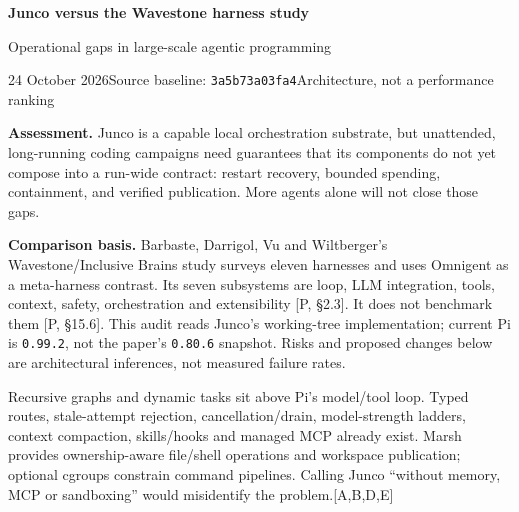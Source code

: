 \documentclass[10pt,a4paper]{article}
\newcommand{\heading}[1]{\par\vspace{5pt}{\large\bfseries\color{ink}#1}\par\vspace{2pt}}
\newcommand{\src}[1]{\textcolor{accent}{\scriptsize[#1]}}
\begin{document}
{\LARGE\bfseries\color{ink}Junco versus the Wavestone harness study}\par
{\large Operational gaps in large-scale agentic programming}\par
{\small 24 October 2026\quad\textbullet\quad Source baseline: \texttt{3a5b73a03fa4}\quad\textbullet\quad Architecture, not a performance ranking}

\textbf{Assessment.} Junco is a capable local orchestration substrate, but unattended, long-running coding campaigns need guarantees that its components do not yet compose into a run-wide contract: restart recovery, bounded spending, containment, and verified publication. More agents alone will not close those gaps.

\textbf{Comparison basis.} Barbaste, Darrigol, Vu and Wiltberger's Wavestone/Inclusive Brains study surveys eleven harnesses and uses Omnigent as a meta-harness contrast. Its seven subsystems are loop, LLM integration, tools, context, safety, orchestration and extensibility [P, \S2.3]. It does not benchmark them [P, \S15.6]. This audit reads Junco's working-tree implementation; current Pi is \texttt{0.99.2}, not the paper's \texttt{0.80.6} snapshot. Risks and proposed changes below are architectural inferences, not measured failure rates.

\heading{What Junco already provides}
Recursive graphs and dynamic tasks sit above Pi's model/tool loop. Typed routes, stale-attempt rejection, cancellation/drain, model-strength ladders, context compaction, skills/hooks and managed MCP already exist. Marsh provides ownership-aware file/shell operations and workspace publication; optional cgroups constrain command pipelines. Calling Junco ``without memory, MCP or sandboxing'' would misidentify the problem.\src{A,B,D,E}
\end{document}
